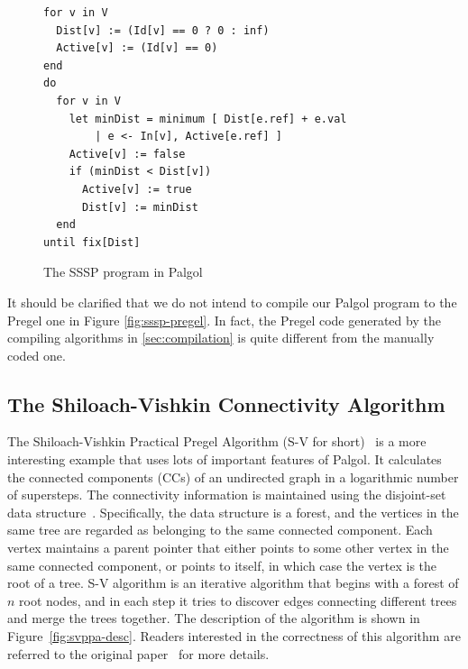\documentclass{sokendai_thesis} %
\begin{document}
\begin{figure}[thp]
\begin{lstlisting}[basicstyle=\footnotesize]
for v in V
  Dist[v] := (Id[v] == 0 ? 0 : inf)
  Active[v] := (Id[v] == 0)
end
do
  for v in V
    let minDist = minimum [ Dist[e.ref] + e.val
        | e <- In[v], Active[e.ref] ]
    Active[v] := false
    if (minDist < Dist[v])
      Active[v] := true
      Dist[v] := minDist
  end
until fix[Dist]
\end{lstlisting}
\vspace{-2ex}
\caption{The SSSP program in Palgol}
\label{fig:sssp-palgol}
\end{figure}


It should be clarified that we do not intend to compile our Palgol program to the Pregel one in Figure \ref{fig:sssp-pregel}.
In fact, the Pregel code generated by the compiling algorithms in \autoref{sec:compilation} is quite different from the manually coded one.

\subsection{The Shiloach-Vishkin Connectivity Algorithm}
\label{sec:svppa}

The Shiloach-Vishkin Practical Pregel Algorithm (S-V for short)~\cite{connectivity} is a more interesting example that uses lots of important features of Palgol.
It calculates the connected components (CCs) of an undirected graph in a logarithmic 
number of supersteps.
The connectivity information is maintained using the disjoint-set data structure~\cite{disjointset}.
Specifically, the data structure is a forest, and the vertices in the same tree are regarded as belonging to the same connected component.
Each vertex maintains a parent pointer that either points to some other vertex in the same connected component, or points to itself, in which case the vertex is the root of a tree.
S-V algorithm is an iterative algorithm that begins with a forest of $n$ root nodes, and in each step it tries to discover edges connecting different trees and merge the trees together.
The description of the algorithm is shown in Figure~\ref{fig:svppa-desc}.
Readers interested in the correctness of this algorithm are referred to the original paper~\cite{connectivity} for more details.
\end{document}
